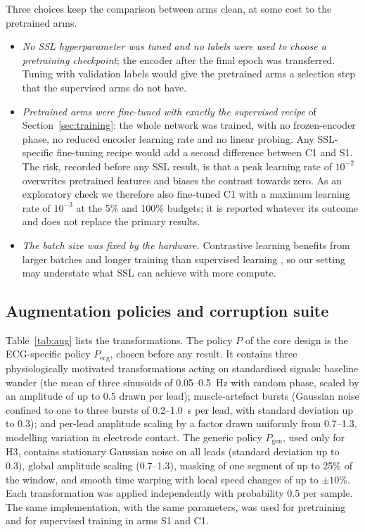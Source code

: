 \documentclass[preprint,12pt]{elsarticle}
\begin{document}
Three choices keep the comparison between arms clean, at some cost to the pretrained arms.
\begin{itemize}
  \item \emph{No SSL hyperparameter was tuned and no labels were used to choose a pretraining checkpoint}; the encoder after the final epoch was transferred. Tuning with validation labels would give the pretrained arms a selection step that the supervised arms do not have.
  \item \emph{Pretrained arms were fine-tuned with exactly the supervised recipe} of Section~\ref{sec:training}: the whole network was trained, with no frozen-encoder phase, no reduced encoder learning rate and no linear probing. Any SSL-specific fine-tuning recipe would add a second difference between C1 and S1. The risk, recorded before any SSL result, is that a peak learning rate of $10^{-2}$ overwrites pretrained features and biases the contrast towards zero. As an exploratory check we therefore also fine-tuned C1 with a maximum learning rate of $10^{-3}$ at the 5\% and 100\% budgets; it is reported whatever its outcome and does not replace the primary results.
  \item \emph{The batch size was fixed by the hardware.} Contrastive learning benefits from larger batches and longer training than supervised learning \cite{chen2020simclr}, so our setting may understate what SSL can achieve with more compute.
\end{itemize}

\subsection{Augmentation policies and corruption suite}
\label{sec:augment}

Table~\ref{tab:aug} lists the transformations. The policy $P$ of the core design is the ECG-specific policy $P_{\text{ecg}}$, chosen before any result. It contains three physiologically motivated transformations acting on standardised signals: baseline wander (the mean of three sinusoids of 0.05--0.5~Hz with random phase, scaled by an amplitude of up to 0.5 drawn per lead); muscle-artefact bursts (Gaussian noise confined to one to three bursts of 0.2--1.0~s per lead, with standard deviation up to 0.3); and per-lead amplitude scaling by a factor drawn uniformly from 0.7--1.3, modelling variation in electrode contact. The generic policy $P_{\text{gen}}$, used only for H3, contains stationary Gaussian noise on all leads (standard deviation up to 0.3), global amplitude scaling (0.7--1.3), masking of one segment of up to 25\% of the window, and smooth time warping with local speed changes of up to $\pm10\%$. Each transformation was applied independently with probability 0.5 per sample. The same implementation, with the same parameters, was used for pretraining and for supervised training in arms S1 and C1.
\end{document}
